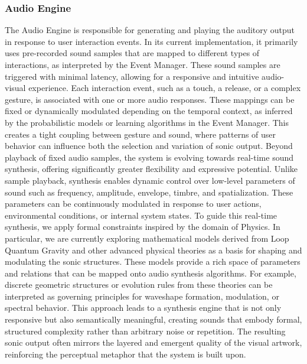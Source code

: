 \documentclass{article}
\begin{document}
\subsubsection{Audio Engine}
The Audio Engine is responsible for generating and playing the auditory output in response to user interaction events. In its current implementation, it primarily uses pre-recorded sound samples that are mapped to different types of interactions, as interpreted by the Event Manager. These sound samples are triggered with minimal latency, allowing for a responsive and intuitive audio-visual experience. \newline 
Each interaction event, such as a touch, a release, or a complex gesture, is associated with one or more audio responses. These mappings can be fixed or dynamically modulated depending on the temporal context, as inferred by the probabilistic models or learning algorithms in the Event Manager. This creates a tight coupling between gesture and sound, where patterns of user behavior can influence both the selection and variation of sonic output. \newline 
Beyond playback of fixed audio samples, the system is evolving towards real-time sound synthesis, offering significantly greater flexibility and expressive potential. Unlike sample playback, synthesis enables dynamic control over low-level parameters of sound such as frequency, amplitude, envelope, timbre, and spatialization. These parameters can be continuously modulated in response to user actions, environmental conditions, or internal system states. \newline 
To guide this real-time synthesis, we apply formal constraints inspired by the domain of Physics. In particular, we are currently exploring mathematical models derived from Loop Quantum Gravity and other advanced physical theories as a basis for shaping and modulating the sonic structures. These models provide a rich space of parameters and relations that can be mapped onto audio synthesis algorithms. For example, discrete geometric structures or evolution rules from these theories can be interpreted as governing principles for waveshape formation, modulation, or spectral behavior. \newline 
This approach leads to a synthesis engine that is not only responsive but also semantically meaningful, creating sounds that embody formal, structured complexity rather than arbitrary noise or repetition. The resulting sonic output often mirrors the layered and emergent quality of the visual artwork, reinforcing the perceptual metaphor that the system is built upon. 
\end{document}
